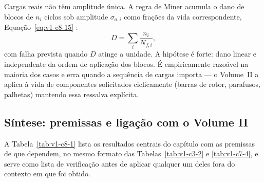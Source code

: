 \documentclass[12pt,a4paper]{article}
\numberwithin{equation}{section}
\numberwithin{table}{section}
\numberwithin{figure}{section}
\begin{document}
Cargas reais não têm amplitude única. A regra de Miner acumula o dano de
blocos de $n_i$ ciclos sob amplitude $\sigma_{a,i}$ como frações da vida
correspondente, Equação~\eqref{eq:v1-c8-15} \cite{shigley2011}:
\begin{equation}\label{eq:v1-c8-15}
D = \sum_i \frac{n_i}{N_{f,i}},
\end{equation}
com falha prevista quando $D$ atinge a unidade. A hipótese é forte: dano
linear e independente da ordem de aplicação dos blocos. É empiricamente
razoável na maioria dos casos e erra quando a sequência de cargas importa ---
o Volume~II a aplica à vida de componentes solicitados ciclicamente (barras
de rotor, parafusos, palhetas) mantendo essa ressalva explícita.

\subsection{Síntese: premissas e ligação com o Volume
II}\label{sub:v1-c8-sintese}

A Tabela~\ref{tab:v1-c8-1} lista os resultados centrais do capítulo com as
premissas de que dependem, no mesmo formato das Tabelas~\ref{tab:v1-c3-2} e
\ref{tab:v1-c7-4}, e serve como lista de verificação antes de aplicar
qualquer um deles fora do contexto em que foi obtido.
\end{document}
